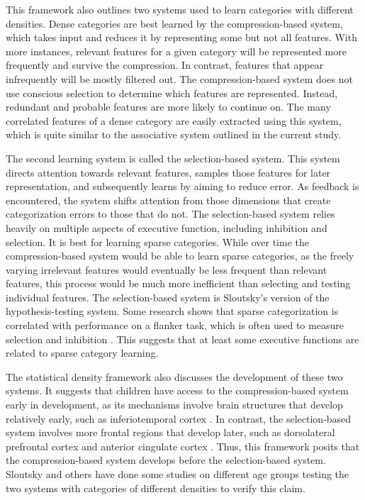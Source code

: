 \documentclass[../dissertation.tex]{subfiles}
\begin{document}
	This framework also outlines two systems used to learn categories with different densities. Dense categories are best learned by the compression-based system, which takes input and reduces it by representing some but not all features. With more instances, relevant features for a given category will be represented more frequently and survive the compression. In contrast, features that appear infrequently will be mostly filtered out. The compression-based system does not use conscious selection to determine which features are represented. Instead, redundant and probable features are more likely to continue on. The many correlated features of a dense category are easily extracted using this system, which is quite similar to the associative system outlined in the current study. \par 
	The second learning system is called the selection-based system. This system directs attention towards relevant features, samples those features for later representation, and subsequently learns by aiming to reduce error. As feedback is encountered, the system shifts attention from those dimensions that create categorization errors to those that do not. The selection-based system relies heavily on multiple aspects of executive function, including inhibition and selection. It is best for learning sparse categories. While over time the compression-based system would be able to learn sparse categories, as the freely varying irrelevant features would eventually be less frequent than relevant features, this process would be much more inefficient than selecting and testing individual features. The selection-based system is Sloutsky's version of the hypothesis-testing system. Some research shows that sparse categorization is correlated with performance on a flanker task, which is often used to measure selection and inhibition \citep{Perry2016}. This suggests that at least some executive functions are related to sparse category learning. \par
	The statistical density framework also discusses the development of these two systems. It suggests that children have access to the compression-based system early in development, as its mechanisms involve brain structures that develop relatively early, such as inferiotemporal cortex \citep{Rodman1994}. In contrast, the selection-based system involves more frontal regions that develop later, such as dorsolateral prefrontal cortex and anterior cingulate cortex \citep{Eshel2007, Lewis1997, Segalowitz2004}. Thus, this framework posits that the compression-based system develops before the selection-based system. Sloutsky and others have done some studies on different age groups testing the two systems with categories of different densities to verify this claim. \par 
\end{document}
